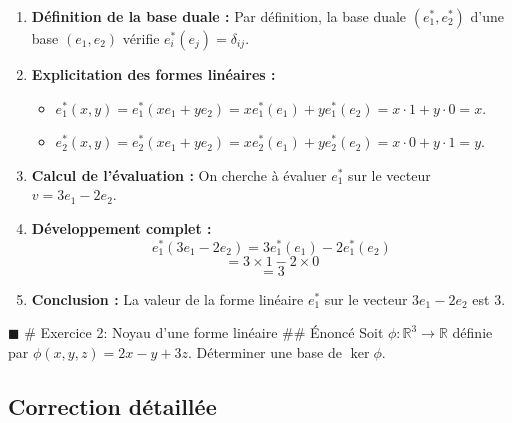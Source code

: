 \begin{enumerate}
\def\labelenumi{\arabic{enumi}.}
\tightlist
\item
  \textbf{Définition de la base duale :} Par définition, la base duale
  \((e_1^*, e_2^*)\) d'une base \((e_1, e_2)\) vérifie
  \(e_i^*(e_j) = \delta_{ij}\).
\item
  \textbf{Explicitation des formes linéaires :}

  \begin{itemize}
  \tightlist
  \item
    \(e_1^*(x, y) = e_1^*(xe_1 + ye_2) = x e_1^*(e_1) + y e_1^*(e_2) = x \cdot 1 + y \cdot 0 = x\).
  \item
    \(e_2^*(x, y) = e_2^*(xe_1 + ye_2) = x e_2^*(e_1) + y e_2^*(e_2) = x \cdot 0 + y \cdot 1 = y\).
  \end{itemize}
\item
  \textbf{Calcul de l'évaluation :} On cherche à évaluer \(e_1^*\) sur
  le vecteur \(v = 3e_1 - 2e_2\).
\item
  \textbf{Développement complet :}
  \[e_1^*(3e_1 - 2e_2) = 3 e_1^*(e_1) - 2 e_1^*(e_2)\]
  \[= 3 \times 1 - 2 \times 0\] \[= 3\]
\item
  \textbf{Conclusion :} La valeur de la forme linéaire \(e_1^*\) sur le
  vecteur \(3e_1 - 2e_2\) est \(3\).
\end{enumerate}

\(\blacksquare\) \# Exercice 2: Noyau d'une forme linéaire \#\# Énoncé
Soit \(\phi : \mathbb{R}^3 \to \mathbb{R}\) définie par
\(\phi(x, y, z) = 2x - y + 3z\). Déterminer une base de \(\ker \phi\).

\hypertarget{correction-duxe9tailluxe9e-1}{%
\subsection{Correction détaillée}\label{correction-duxe9tailluxe9e-1}}

